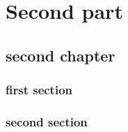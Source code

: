 \documentclass[a5paper,twoside,headsepline,pagesize,10pt,DIV=12]{scrbook}
\begin{document}
\part{Second part}
\chapter{second chapter}
      \section{first section}
      \lipsum[1-2]
      \section{second section}
      \lipsum[1-2]


\backmatter
    {
        \small
        
%         
%       
%       
    }



\end{document}
